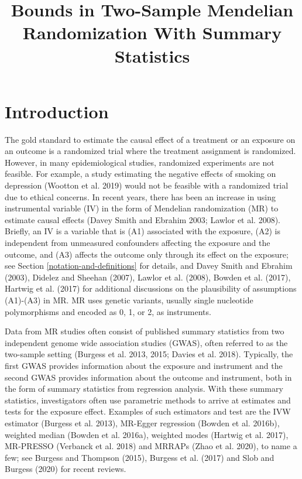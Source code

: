 \documentclass[
]{article}
\title{Bounds in Two-Sample Mendelian Randomization With Summary Statistics}
\author{}
\date{\vspace{-2.5em}}
\theoremstyle{plain}
\begin{document}
\maketitle

{
\setcounter{tocdepth}{2}
\tableofcontents
}
\newpage

\hypertarget{introduction}{%
\section{Introduction}\label{introduction}}

The gold standard to estimate the causal effect of a treatment or an exposure on an outcome is a randomized trial where the treatment assignment is randomized. However, in many epidemiological studies, randomized experiments are not feasible. For example, a study estimating the negative effects of smoking on depression (Wootton et al. 2019) would not be feasible with a randomized trial due to ethical concerns. In recent years, there has been an increase in using instrumental variable (IV) in the form of Mendelian randomization (MR) to estimate causal effects (Davey Smith and Ebrahim 2003; Lawlor et al. 2008). Briefly, an IV is a variable that is (A1) associated with the exposure, (A2) is independent from unmeasured confounders affecting the exposure and the outcome, and (A3) affects the outcome only through its effect on the exposure; see Section \ref{notation-and-definitions} for details, and Davey Smith and Ebrahim (2003), Didelez and Sheehan (2007), Lawlor et al. (2008), Bowden et al. (2017), Hartwig et al. (2017) for additional discussions on the plausibility of assumptions (A1)-(A3) in MR. MR uses genetic variants, usually single nucleotide polymorphisms and encoded as 0, 1, or 2, as instruments.

Data from MR studies often consist of published summary statistics from two independent genome wide association studies (GWAS), often referred to as the two-sample setting (Burgess et al. 2013, 2015; Davies et al. 2018). Typically, the first GWAS provides information about the exposure and instrument and the second GWAS provides information about the outcome and instrument, both in the form of summary statistics from regression analysis. With these summary statistics, investigators often use parametric methods to arrive at estimates and tests for the exposure effect. Examples of such estimators and test are the IVW estimator (Burgess et al. 2013), MR-Egger regression (Bowden et al. 2016b), weighted median (Bowden et al. 2016a), weighted modes (Hartwig et al. 2017), MR-PRESSO (Verbanck et al. 2018) and MRRAPs (Zhao et al. 2020), to name a few; see Burgess and Thompson (2015), Burgess et al. (2017) and Slob and Burgess (2020) for recent reviews.
\end{document}
